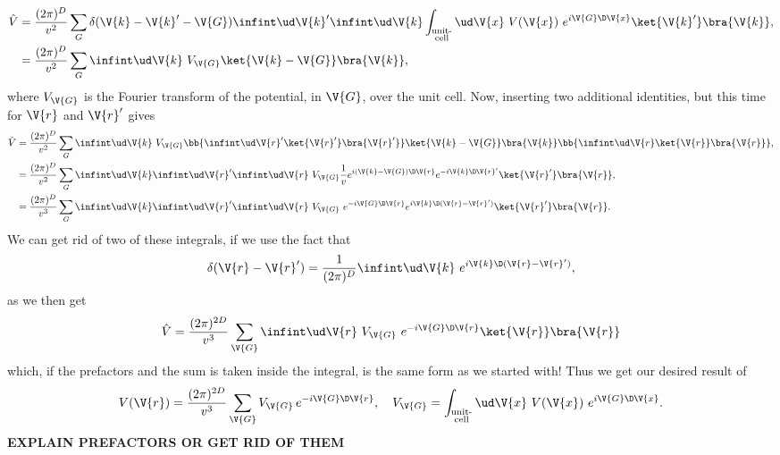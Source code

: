 \documentclass[main.tex]{subfiles}
\begin{document}
	\begin{align}
		\hat{V} &= \frac{(2\pi)^D}{v^2} \sum_{G} \delta(\V{k}-\V{k}'-\V{G}) \infint \ud \V{k}' \infint \ud \V{k} \int_{\substack{\text{unit-} \\\text{cell}}} \ud \V{x}\ V(\V{x})\  e^{i \V{G} \D \V{x}} \ket{\V{k}'} \bra{\V{k}}, \\
		&= \frac{(2\pi)^D}{v^2} \sum_{G} \infint \ud \V{k}\ V_{\V{G}} \ket{\V{k}-\V{G}} \bra{\V{k}},
	\end{align}
	where $ V_{\V{G}} $ is the Fourier transform of the potential, in $ \V{G} $, over the unit cell. Now, inserting two additional identities, but this time for $ \V{r} $ and $ \V{r}' $ gives
	\begin{align}
		\hat{V} &= \frac{(2\pi)^D}{v^2} \sum_{G} \infint \ud \V{k} \ V_{\V{G}} \bb{\infint \ud \V{r}' \ket{\V{r}'} \bra{\V{r}'}} \ket{\V{k}-\V{G}} \bra{\V{k}} \bb{\infint \ud \V{r} \ket{\V{r}} \bra{\V{r}} }, \\
		&= \frac{(2\pi)^D}{v^2} \sum_{G} \infint \ud \V{k} \infint \ud \V{r}' \infint \ud \V{r} \   V_{\V{G}} \frac{1}{v} e^{i (\V{k}-\V{G}) \D \V{r}} e^{-i \V{k} \D \V{r}'} \ket{\V{r}'} \bra{\V{r}}, \\
		&= \frac{(2\pi)^D}{v^3} \sum_{G} \infint \ud \V{k} \infint \ud \V{r}' \infint \ud \V{r} \  V_{\V{G}} \  e^{-i \V{G} \D \V{r}} e^{i \V{k} \D (\V{r}-\V{r}')} \ket{\V{r}'} \bra{\V{r}}.
	\end{align}
	We can get rid of two of these integrals, if we use the fact that
	\begin{equation}
		\delta(\V{r}-\V{r}') = \frac{1}{(2\pi)^D} \infint \ud \V{k}\  e^{i \V{k} \D (\V{r}-\V{r}')},
	\end{equation}
	as we then get
	\begin{equation}
		\hat{V} = \frac{(2\pi)^{2D}}{v^3} \sum_{\V{G}} \infint \ud \V{r} \ V_{\V{G}}\ e^{-i \V{G} \D \V{r}} \ket{\V{r}} \bra{\V{r}}
	\end{equation}
	which, if the prefactors and the sum is taken inside the integral, is the same form as we started with! Thus we get our desired result of
	\begin{equation}
		V(\V{r}) =  \frac{(2\pi)^{2D}}{v^3} \sum_{\V{G}} V_{\V{G}} \,e^{-i \V{G} \D \V{r}}, \quad V_{\V{G}} = \int_{\substack{\text{unit-} \\\text{cell}}} \ud \V{x}\ V(\V{x})\  e^{i \V{G} \D \V{x}}.
	\end{equation}
	\textbf{EXPLAIN PREFACTORS OR GET RID OF THEM}
	
\end{document}
